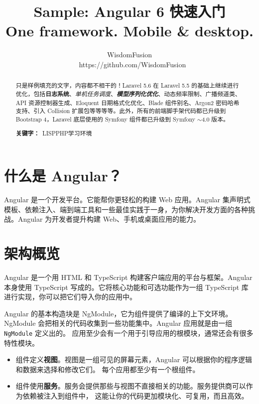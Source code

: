 \documentclass{progartcn}
\title{\bfseries\sffamily
  Sample: Angular 6 快速入门\\
  \normalfont\zihao{-3}
  One framework. Mobile \& desktop.
}
\author{WisdomFusion \\ \faGithubAlt~ https://github.com/WisdomFusion}
\date{}
\begin{document}
\sloppy %


\maketitle
\thispagestyle{empty}


\begin{abstract}
\noindent 只是样例填充的文字，内容都不相干的！Laravel 5.6 在 Laravel 5.5 的基础上继续进行优化，包括\textbf{日志系统}、\textit{单机任务调度}、\textbf{\textit{模型序列化优化}}、动态频率限制、广播频道类、API 资源控制器生成、Eloquent 日期格式化优化、Blade 组件别名、Argon2 密码哈希支持、引入 Collision 扩展包等等等等。此外，所有的前端脚手架代码都已升级到 Bootstrap 4，Laravel 底层使用的 Symfony 组件都已升级到 Symfony $\sim$4.0 版本。

\vspace{2ex}
\noindent \textbf{关键字：}~LISP\quad{}PHP\quad{}学习环境
\end{abstract}

\section{什么是 Angular？}
\label{newfeatures}

Angular 是一个开发平台。它能帮你更轻松的构建 Web 应用。Angular 集声明式模板、依赖注入、端到端工具和一些最佳实践于一身，为你解决开发方面的各种挑战。Angular 为开发者提升构建 Web、手机或桌面应用的能力。

\section{架构概览}

Angular 是一个用 HTML 和 TypeScript 构建客户端应用的平台与框架。Angular 本身使用 TypeScript 写成的。它将核心功能和可选功能作为一组 TypeScript 库进行实现，你可以把它们导入你的应用中。

Angular 的基本构造块是 NgModule，它为组件提供了编译的上下文环境。 NgModule 会把相关的代码收集到一些功能集中。Angular 应用就是由一组 \verb|NgModule| 定义出的。 应用至少会有一个用于引导应用的根模块，通常还会有很多特性模块。

\begin{itemize}
  \item 组件定义\textbf{视图}。视图是一组可见的屏幕元素，Angular 可以根据你的程序逻辑和数据来选择和修改它们。 每个应用都至少有一个根组件。
  
  \item 组件使用\textbf{服务}。服务会提供那些与视图不直接相关的功能。服务提供商可以作为依赖被注入到组件中， 这能让你的代码更加模块化、可复用，而且高效。
\end{itemize}
\end{document}
